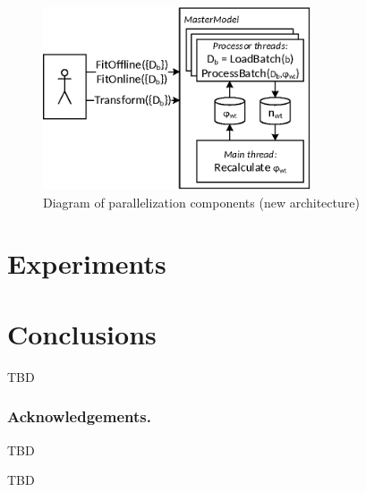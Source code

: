 \documentclass[russian,english]{llncs}
\begin{document}
\begin{figure}[t]
\begin{centering}
\includegraphics[height=54mm]{diagramm_artm_core_v07.eps}
\caption{Diagram of parallelization components (new architecture)}
\label{fig:diagramm_artm_core}
\end{centering}
\end{figure}

\section{Experiments}
\label{sec:Experiments}

\section{Conclusions}
\label{sec:Conclusions}

TBD

\bigskip
\subsubsection*{Acknowledgements.}

TBD

%
%

\begin{thebibliography}{10}

TBD

\end{thebibliography}
\end{document}
